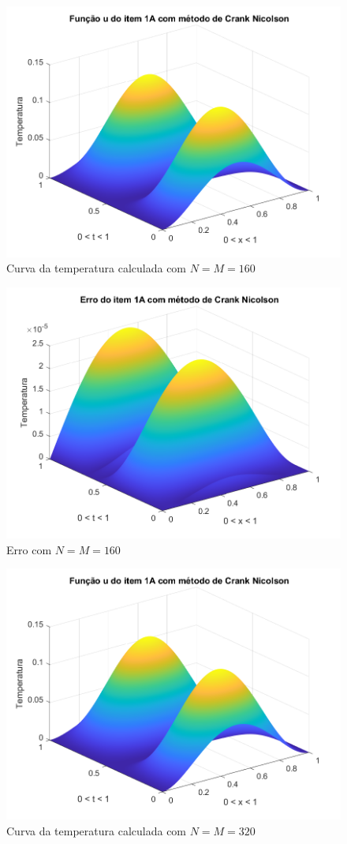\documentclass[12pt]{article}
\begin{document}
\begin{spacing}{1.5}
\begin{figure}
    \centering
    \includegraphics[width=0.8\linewidth]{Segunda_Tarefa/ItemC/nm160_calculada_A.png}
    \caption{Curva da temperatura calculada com $N=M=160$}
    \label{fig:CA_nm160_calculada}
\end{figure}

\begin{figure}
    \centering
    \includegraphics[width=0.8\linewidth]{Segunda_Tarefa/ItemC/nm160_erro_A.png}
    \caption{Erro com $N=M=160$}
    \label{fig:CA_nm160_erro}
\end{figure}

\begin{figure}
    \centering
    \includegraphics[width=0.8\linewidth]{Segunda_Tarefa/ItemC/nm320_calculada_A.png}
    \caption{Curva da temperatura calculada com $N=M=320$}
    \label{fig:CA_nm320_calculada}
\end{figure}


\end{spacing}
\end{document}
